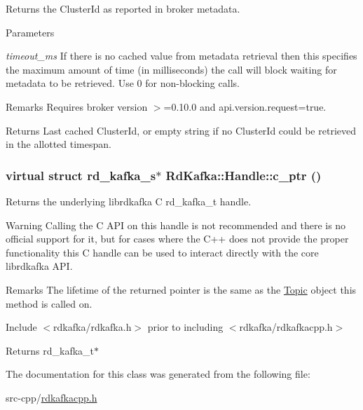 Returns the ClusterId as reported in broker metadata. 
\begin{DoxyParams}{Parameters}
\item[{\em timeout\_\-ms}]If there is no cached value from metadata retrieval then this specifies the maximum amount of time (in milliseconds) the call will block waiting for metadata to be retrieved. Use 0 for non-\/blocking calls.\end{DoxyParams}
\begin{DoxyRemark}{Remarks}
Requires broker version $>$=0.10.0 and api.version.request=true.
\end{DoxyRemark}
\begin{DoxyReturn}{Returns}
Last cached ClusterId, or empty string if no ClusterId could be retrieved in the allotted timespan. 
\end{DoxyReturn}
\hypertarget{classRdKafka_1_1Handle_a9272aad75da9739bb6403999e6bca47c}{
\subsubsection[{c\_\-ptr}]{\setlength{\rightskip}{0pt plus 5cm}virtual struct rd\_\-kafka\_\-s$\ast$ RdKafka::Handle::c\_\-ptr ()}}
\label{classRdKafka_1_1Handle_a9272aad75da9739bb6403999e6bca47c}


Returns the underlying librdkafka C rd\_\-kafka\_\-t handle. \begin{DoxyWarning}{Warning}
Calling the C API on this handle is not recommended and there is no official support for it, but for cases where the C++ does not provide the proper functionality this C handle can be used to interact directly with the core librdkafka API.
\end{DoxyWarning}
\begin{DoxyRemark}{Remarks}
The lifetime of the returned pointer is the same as the \hyperlink{classRdKafka_1_1Topic}{Topic} object this method is called on.

Include $<$rdkafka/rdkafka.h$>$ prior to including $<$rdkafka/rdkafkacpp.h$>$
\end{DoxyRemark}
\begin{DoxyReturn}{Returns}
{\ttfamily rd\_\-kafka\_\-t$\ast$} 
\end{DoxyReturn}


The documentation for this class was generated from the following file:\begin{DoxyCompactItemize}
\item 
src-\/cpp/\hyperlink{rdkafkacpp_8h}{rdkafkacpp.h}\end{DoxyCompactItemize}

